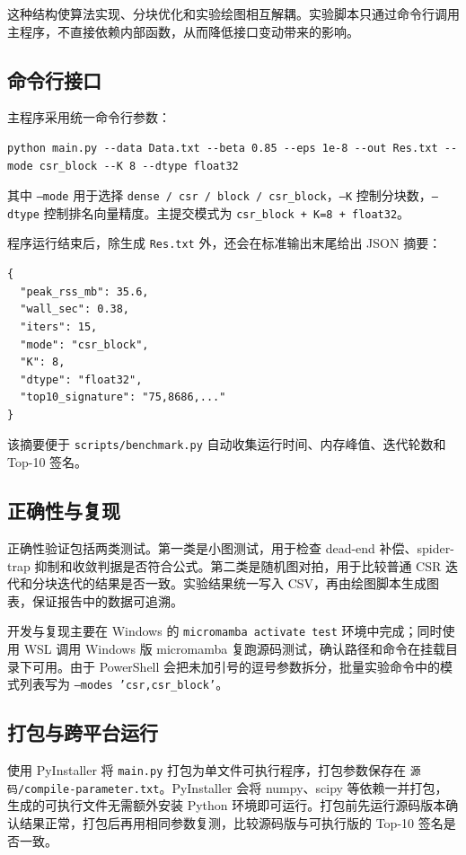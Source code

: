 \documentclass[UTF8,a4paper,12pt]{ctexart}
\begin{document}
这种结构使算法实现、分块优化和实验绘图相互解耦。实验脚本只通过命令行调用主程序，不直接依赖内部函数，从而降低接口变动带来的影响。

\subsection{命令行接口}

主程序采用统一命令行参数：

\begin{lstlisting}
python main.py --data Data.txt --beta 0.85 --eps 1e-8 --out Res.txt --mode csr_block --K 8 --dtype float32
\end{lstlisting}

其中 \texttt{--mode} 用于选择 \texttt{dense / csr / block / csr\_block}，\texttt{--K} 控制分块数，\texttt{--dtype} 控制排名向量精度。主提交模式为 \texttt{csr\_block + K=8 + float32}。

程序运行结束后，除生成 \texttt{Res.txt} 外，还会在标准输出末尾给出 JSON 摘要：

\begin{lstlisting}
{
  "peak_rss_mb": 35.6,
  "wall_sec": 0.38,
  "iters": 15,
  "mode": "csr_block",
  "K": 8,
  "dtype": "float32",
  "top10_signature": "75,8686,..."
}
\end{lstlisting}

该摘要便于 \texttt{scripts/benchmark.py} 自动收集运行时间、内存峰值、迭代轮数和 Top-10 签名。

\subsection{正确性与复现}

正确性验证包括两类测试。第一类是小图测试，用于检查 dead-end 补偿、spider-trap 抑制和收敛判据是否符合公式。第二类是随机图对拍，用于比较普通 CSR 迭代和分块迭代的结果是否一致。实验结果统一写入 CSV，再由绘图脚本生成图表，保证报告中的数据可追溯。

开发与复现主要在 Windows 的 \texttt{micromamba activate test} 环境中完成；同时使用 WSL 调用 Windows 版 micromamba 复跑源码测试，确认路径和命令在挂载目录下可用。由于 PowerShell 会把未加引号的逗号参数拆分，批量实验命令中的模式列表写为 \texttt{--modes 'csr,csr\_block'}。

\subsection{打包与跨平台运行}

使用 PyInstaller 将 \texttt{main.py} 打包为单文件可执行程序，打包参数保存在 \texttt{源码/compile-parameter.txt}。PyInstaller 会将 numpy、scipy 等依赖一并打包，生成的可执行文件无需额外安装 Python 环境即可运行。打包前先运行源码版本确认结果正常，打包后再用相同参数复测，比较源码版与可执行版的 Top-10 签名是否一致。
\end{document}
